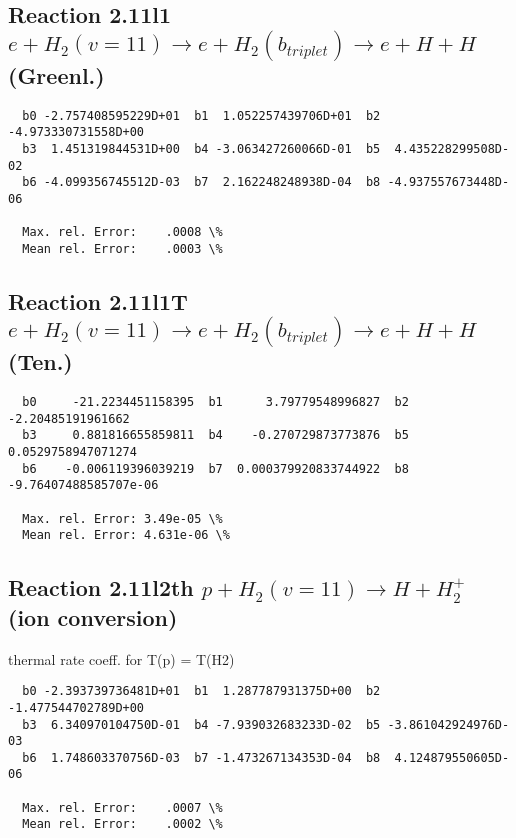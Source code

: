 \documentclass[12pt,dvipdfmx]{article}
\begin{document}
\newpage
\subsection{
Reaction 2.11l1
$ e + H_2(v=11) \rightarrow e + H_2(b_{triplet})\rightarrow e + H + H $ (Greenl.)
}


\begin{small}\begin{verbatim}
  b0 -2.757408595229D+01  b1  1.052257439706D+01  b2 -4.973330731558D+00
  b3  1.451319844531D+00  b4 -3.063427260066D-01  b5  4.435228299508D-02
  b6 -4.099356745512D-03  b7  2.162248248938D-04  b8 -4.937557673448D-06

  Max. rel. Error:    .0008 \%
  Mean rel. Error:    .0003 \%
\end{verbatim}\end{small}


\subsection{
Reaction 2.11l1T
$  e + H_2(v=11) \rightarrow e + H_2(b_{triplet})\rightarrow e + H + H $ (Ten.)
}


\begin{small}\begin{verbatim}
  b0     -21.2234451158395  b1      3.79779548996827  b2     -2.20485191961662
  b3     0.881816655859811  b4    -0.270729873773876  b5    0.0529758947071274
  b6    -0.006119396039219  b7  0.000379920833744922  b8 -9.76407488585707e-06

  Max. rel. Error: 3.49e-05 \%
  Mean rel. Error: 4.631e-06 \%
\end{verbatim}\end{small}

\subsection{
Reaction 2.11l2th
$ p + H_2(v=11) \rightarrow H + H_2^+$ (ion conversion)
}
thermal rate coeff. for T(p) = T(H2)

\begin{small}\begin{verbatim}
  b0 -2.393739736481D+01  b1  1.287787931375D+00  b2 -1.477544702789D+00
  b3  6.340970104750D-01  b4 -7.939032683233D-02  b5 -3.861042924976D-03
  b6  1.748603370756D-03  b7 -1.473267134353D-04  b8  4.124879550605D-06

  Max. rel. Error:    .0007 \%
  Mean rel. Error:    .0002 \%
\end{verbatim}\end{small}
\end{document}
